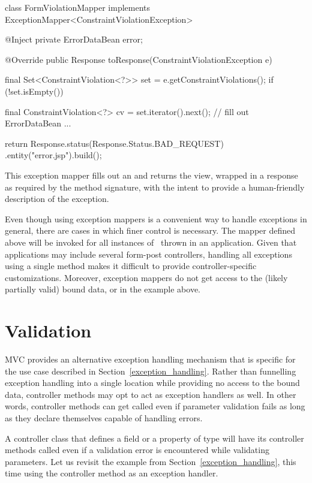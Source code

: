 \begin{listing}{1}
class FormViolationMapper implements 
                          ExceptionMapper<ConstraintViolationException> {

    @Inject
    private ErrorDataBean error;

    @Override
    public Response toResponse(ConstraintViolationException e) {
        final Set<ConstraintViolation<?>> set = e.getConstraintViolations();
        if (!set.isEmpty()) {
            final ConstraintViolation<?> cv = set.iterator().next();
            // fill out ErrorDataBean ...

        }
        return Response.status(Response.Status.BAD_REQUEST)
                       .entity("error.jsp").build();
    }
}
\end{listing}

This exception mapper fills out an  and returns the  view, 
wrapped in a response as required by the method signature, with the intent to provide a human-friendly 
description of the exception.

Even though using exception mappers is a convenient way to handle exceptions in general, 
there are cases in which finer control is necessary. The mapper defined above will be
invoked for all instances of \ConstVioExc\ thrown in an application. Given that 
applications may include several form-post controllers, handling all exceptions using
a single method makes it difficult to provide controller-specific customizations.
Moreover, exception mappers do not get access to the (likely partially valid) bound
data, or  in the example above.

\section{Validation}
\label{validation}

MVC provides an alternative exception handling mechanism that is specific for the 
use case described in Section~\ref{exception_handling}. Rather than funnelling 
exception handling into a single location while providing no access to the bound
data, controller methods may opt to act as exception handlers as well. In other words, 
controller methods can get called even if parameter validation fails as long as
they declare themselves capable of handling errors.

A controller class that defines a field or a property of type 
 will have its controller methods
called even if a validation error is encountered while validating parameters. 
Let us revisit the example from Section~\ref{exception_handling},
this time using the controller method as an exception handler.

